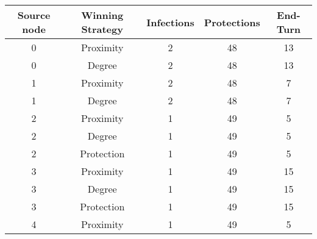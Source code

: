 \documentclass[results.tex]{subfiles}
\begin{document}
    \begin{center}
        \begin{tabular}{| c || c | c | c | c |}
            \hline
            {\bfseries Source node} & {\bfseries Winning Strategy} & {\bfseries Infections} & {\bfseries Protections}
            & {\bfseries End-Turn}
            \\  %
            \hline\hline
            0                       & Proximity                    & 2                      & 48                      & 13                   \\
            \hline
            0                       & Degree                       & 2                      & 48                      & 13                   \\
            \hline
            1                       & Proximity                    & 2                      & 48                      & 7                    \\
            \hline
            1                       & Degree                       & 2                      & 48                      & 7                    \\
            \hline
            2                       & Proximity                    & 1                      & 49                      & 5                    \\
            \hline
            2                       & Degree                       & 1                      & 49                      & 5                    \\
            \hline
            2                       & Protection                   & 1                      & 49                      & 5                    \\
            \hline
            3                       & Proximity                    & 1                      & 49                      & 15                   \\
            \hline
            3                       & Degree                       & 1                      & 49                      & 15                   \\
            \hline
            3                       & Protection                   & 1                      & 49                      & 15                   \\
            \hline
            4                       & Proximity                    & 1                      & 49                      & 5                    \\

\end{tabular}
\end{center}
\end{document}
